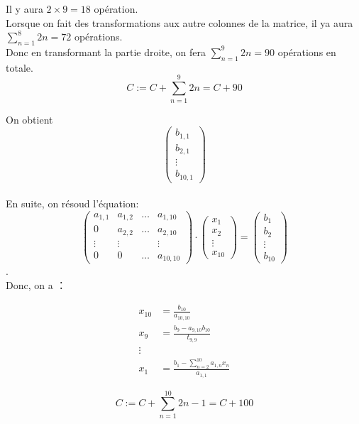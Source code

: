 \documentclass{article}
\begin{document}
\begin{itemize}
Il y aura $2\times9=18$ opération.\\
Lorsque on fait des transformations aux autre colonnes de la matrice, il ya aura $\sum_{n=1}^{8} 2n=72$ opérations.\\
Donc en transformant la partie droite, on fera $\sum_{n=1}^{9} 2n=90$ opérations en totale.
\[
        C := C + \sum_{n=1}^{9}2n = C + 90
        \]

On obtient 
\[\begin{pmatrix}
b_{1,1}\\
b_{2,1}\\
\vdots\\
b_{10,1}
\end{pmatrix}\]\\
En suite, on résoud l'équation: 
\[\begin{pmatrix} 
                a_{1,1} & a_{1,2} & \ldots & a_{1, 10}\\
                0 & a_{2, 2} & \ldots & a_{2, 10}\\
                \vdots & \vdots & & \vdots\\
                0 & 0 & \ldots & a_{10,10}
            \end{pmatrix}\cdot\begin{pmatrix} 
            x_1\\
            x_2\\
            \vdots\\
            x_{10}\end{pmatrix}=\begin{pmatrix}
b_{1}\\
b_{2}\\
\vdots\\
b_{10}
\end{pmatrix}\].\\
Donc, on a ：

\begin{align*}
    x_{10} &= \frac{b_{10}}{a_{10,10}} \\
    x_9 &= \frac{b_9 - a_{9,10}b_{10}}{t_{9,9}} \\
    \vdots \\
    x_1 &= \frac{b_1 - \sum_{n=2}^{10} a_{1,n}x_n}{a_{1,1}}
\end{align*}

        \[
        C := C + \sum_{n=1}^{10}2n-1 = C + 100
        \]


\end{itemize}
\end{document}
